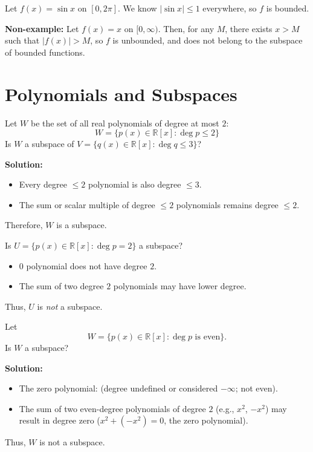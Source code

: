 \documentclass[11pt,a4paper]{article}
\theoremstyle{definition}
\theoremstyle{plain}
\theoremstyle{remark}
\begin{document}
\begin{additional_example}
Let $f(x) = \sin x$ on $[0, 2\pi]$. We know $|\sin x| \le 1$ everywhere, so $f$ is bounded.

\textbf{Non-example:} Let $f(x) = x$ on $[0, \infty)$. Then, for any $M$, there exists $x > M$ such that $|f(x)| > M$, so $f$ is unbounded, and does not belong to the subspace of bounded functions.
\end{additional_example}

\section{Polynomials and Subspaces}

\begin{original_example}[title=Polynomials of Degree at Most Two]
Let $W$ be the set of all real polynomials of degree at most $2$:
\[
    W = \{ p(x) \in \mathbb{R}[x] : \deg p \leq 2 \}
\]
Is $W$ a subspace of $V = \{ q(x) \in \mathbb{R}[x] : \deg q \leq 3 \}$?

\textbf{Solution:}
\begin{itemize}
    \item Every degree $\leq 2$ polynomial is also degree $\leq 3$.
    \item The sum or scalar multiple of degree $\leq 2$ polynomials remains degree $\leq 2$.
\end{itemize}
Therefore, $W$ is a subspace.
\end{original_example}

\begin{additional_example}
Is $U = \{p(x) \in \mathbb{R}[x]: \deg p = 2\}$ a subspace?
\begin{itemize}
    \item $0$ polynomial does not have degree $2$.
    \item The sum of two degree $2$ polynomials may have lower degree.
\end{itemize}
Thus, $U$ is \emph{not} a subspace.
\end{additional_example}

\begin{original_example}[title=Polynomials of Even Degree]
Let 
\[
    W = \{ p(x) \in \mathbb{R}[x] : \deg p \text{ is even} \}.
\]
Is $W$ a subspace?

\textbf{Solution:}
\begin{itemize}
    \item The zero polynomial: (degree undefined or considered $-\infty$; not even).
    \item The sum of two even-degree polynomials of degree $2$ (e.g., $x^2$, $-x^2$) may result in degree zero ($x^2 + (-x^2) = 0$, the zero polynomial).
\end{itemize}
Thus, $W$ is not a subspace.
\end{original_example}
\end{document}
